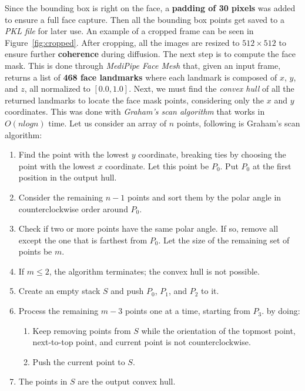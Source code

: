 \documentclass[preprint]{elsarticle}
\begin{document}
Since the bounding box is right on the face, a \textbf{padding of 30 pixels} was added to ensure a full face capture. Then all the bounding box points get saved to a \emph{PKL file} for later use.  An example of a cropped frame can be seen in Figure~\ref{fig:cropped}. After cropping, all the images are resized to $512 \times 512$ to ensure further \textbf{coherence} during diffusion.  The next step is to compute the face mask.  This is done through \emph{MediPipe Face Mesh} that, given an input frame, returns a list of \textbf{468 face landmarks}  where each landmark is composed of $x$, $y$, and $z$, all normalized to  $[0.0, 1.0]$.  Next, we must find the \emph{convex hull} of all the returned landmarks to locate the face mask points, considering only the $x$ and $y$ coordinates. 
This was done with \emph{Graham's scan algorithm} \cite{GRAHAM1972132} that works in $O(n log n)$ time. Let us consider an array of $n$ points, following is Graham's scan algorithm:



\begin{enumerate}
	\item Find the point with the lowest $y$ coordinate, breaking ties by choosing the point with the lowest $x$ coordinate. 
	Let this point be $P_0$. Put $P_0$ at the first position in the output hull.
	\item Consider the remaining $n-1$ points and sort them by the polar angle in counterclockwise order around $P_0$.
	\item Check if two or more points have the same polar angle. If so, remove all except the one that is farthest from $P_0$. 
	Let the size of the remaining set of points be $m$.
	\item If $m \leq 2$, the algorithm terminates; the convex hull is not possible.
	\item Create an empty stack $S$ and push $P_0$, $P_1$, and $P_2$ to it.
	\item Process the remaining $m-3$ points one at a time, starting from $P_3$. by doing:
	\begin{enumerate}
		\item Keep removing points from $S$ while the orientation of the topmost point, next-to-top point, and current point is not counterclockwise.
		\item Push the current point to $S$.
	\end{enumerate}
	\item The points in $S$ are the output convex hull.
\end{enumerate}
\end{document}
